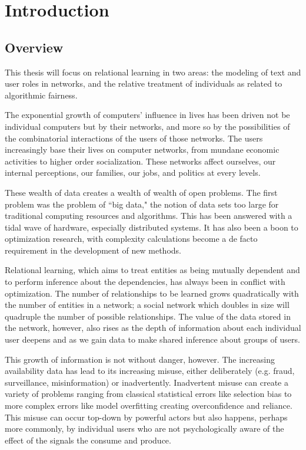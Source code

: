 \chapter{Introduction}

\section{Overview}

This thesis will focus on relational learning in two areas: the modeling of text and user roles in networks, and the relative treatment of individuals as related to algorithmic fairness.  

The exponential growth of computers' influence in lives has been driven not be individual computers but by their networks, and more so by the possibilities of the combinatorial interactions of the users of those networks.  The users increasingly base their lives on computer networks, from mundane economic activities to higher order socialization.  These networks affect ourselves, our internal perceptions, our families, our jobs, and politics at every levels.

These wealth of data creates a wealth of wealth of open problems.  The first problem was the problem of ``big data," the notion of data sets too large for traditional computing resources and algorithms.  This has been answered with a tidal wave of hardware, especially distributed systems.  It has also been a boon to optimization research, with complexity calculations become a de facto requirement in the development of new methods.

Relational learning, which aims to treat entities as being mutually dependent and to perform inference about the dependencies, has always been in conflict with optimization.  The number of relationships to be learned grows quadratically with the number of entities in a network; a social network which doubles in size will quadruple the number of possible relationships.  The value of the data stored in the network, however, also rises as the depth of information about each individual user deepens and as we gain data to make shared inference about groups of users.

This growth of information is not without danger, however.  The increasing availability data has lead to its increasing misuse, either deliberately (e.g. fraud, surveillance, misinformation) or inadvertently.  Inadvertent misuse can create a variety of problems ranging from classical statistical errors like selection bias to more complex errors like model overfitting creating overconfidence and reliance.  This misuse can occur top-down by powerful actors but also happens, perhaps more commonly, by individual users who are not psychologically aware of the effect of the signals the consume and produce.



